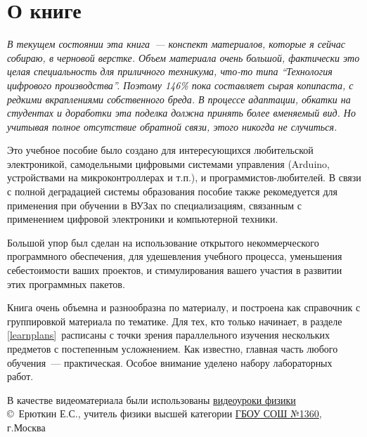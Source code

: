 \clearpage\section*{О книге}

\emph{В текущем состоянии эта книга\ --- конспект материалов, которые я сейчас
собираю, в черновой верстке. Объем материала очень большой, фактически это целая
специальность для приличного техникума, что-то типа ``Технология цифрового
производства''. Поэтому 146\% пока составляет сырая копипаста, с редкими
вкраплениями собственного бреда. В процессе адаптации, обкатки на студентах и
доработки эта поделка должна принять более вменяемый вид. Но учитывая полное
отсутствие обратной связи, этого никогда не случиться.}
\bigskip

Это учебное пособие было создано для интересующихся любительской электроникой,
самодельными цифровыми системами управления (Arduino, устройствами на
микроконтроллерах и т.п.), и программистов-лю\-би\-те\-лей. В связи с полной
деградацией системы образования пособие также рекомедуется для применения при
обучении в ВУЗах по специализациям, связанным с применением цифровой электроники
и компьютерной техники.

Большой упор был сделан на использование открытого некоммерческого программного
обеспечения, для удешевления учебного процесса, уменьшения себестоимости ваших
проектов, и
стимулирования вашего участия в развитии этих программных пакетов.

Книга очень объемна и разнообразна по материалу, и построена как справочник с
группировкой материала по тематике. Для тех, кто только начинает, в разделе
\ref{learnplans}\ расписаны  с
точки зрения параллельного изучения нескольких предметов с постепенным
усложнением. Как
известно, главная часть любого обучения\ --- практическая. Особое внимание
уделено набору лабораторных работ.

\bigskip
В качестве видеоматериала были использованы 
\href{https://www.youtube.com/playlist?list=PLddc343N7YqgCWlspw08g6t0iFos9gAi4}{видеоуроки
физики}\\
\copyright\ Ерюткин Е.С., учитель физики высшей категории 
\href{http://sch1360v.mskobr.ru/}{ГБОУ СОШ №1360}, г.Москва

